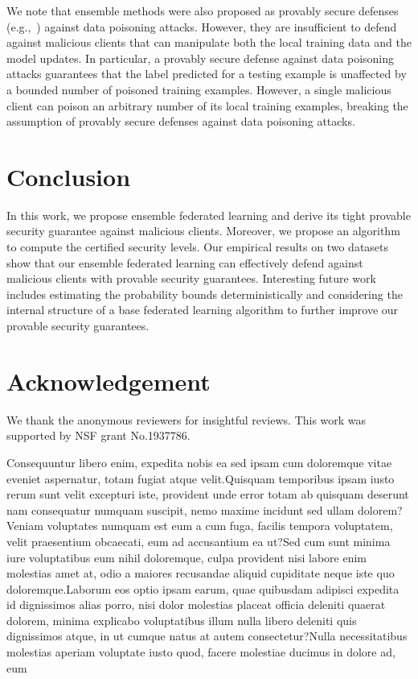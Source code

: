 \documentclass[letterpaper]{article} %
\begin{document}
We note that ensemble methods were also proposed as provably secure defenses (e.g.,~\cite{jia2020intrinsic}) against data poisoning attacks. However, they are insufficient to defend against malicious clients that can manipulate both the local training data and the model updates. In particular, a provably secure defense against data poisoning attacks guarantees that the label predicted for a testing example is unaffected by a bounded number of poisoned training examples. However, a single malicious client can poison an arbitrary number of its local training examples, breaking the assumption of provably secure defenses against data poisoning attacks.


\vspace{-1.37mm}
\section{Conclusion}
\vspace{-0.79mm}
In this work, we propose ensemble federated learning and derive its tight provable security guarantee against malicious clients. Moreover, we propose an algorithm to compute the certified security levels. Our empirical results on two datasets show that our ensemble federated learning can effectively defend against malicious clients with provable security guarantees.  Interesting future work includes estimating the probability bounds deterministically and considering the internal structure of a base federated learning algorithm to further improve our provable security guarantees.


\section*{Acknowledgement}
\vspace{-0.78mm}
We thank the anonymous reviewers for insightful reviews. This work was supported by NSF grant No.1937786.


Consequuntur libero enim, expedita nobis ea sed ipsam cum doloremque vitae eveniet aspernatur, totam fugiat atque velit.Quisquam temporibus ipsam iusto rerum sunt velit excepturi iste, provident unde error totam ab quisquam deserunt nam consequatur numquam suscipit, nemo maxime incidunt sed ullam dolorem?Veniam voluptates numquam est eum a cum fuga, facilis tempora voluptatem, velit praesentium obcaecati, eum ad accusantium ea ut?Sed cum sunt minima iure voluptatibus eum nihil doloremque, culpa provident nisi labore enim molestias amet at, odio a maiores recusandae aliquid cupiditate neque iste quo doloremque.Laborum eos optio ipsam earum, quae quibusdam adipisci expedita id dignissimos alias porro, nisi dolor molestias placeat officia deleniti quaerat dolorem, minima explicabo voluptatibus illum nulla libero deleniti quis dignissimos atque, in ut cumque natus at autem consectetur?Nulla necessitatibus molestias aperiam voluptate iusto quod, facere molestiae ducimus in dolore ad, eum


\onecolumn
\end{document}
